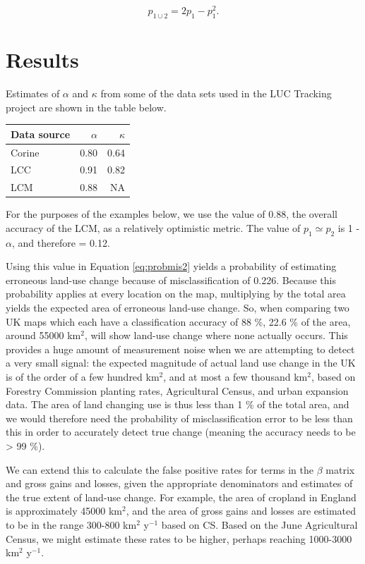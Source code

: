 \documentclass[
]{book}
\begin{document}
\begin{equation} \label{eq:probmis2}
  p_{1 \cup 2} = 2 p_1 - p_1^2.
\end{equation}

\hypertarget{results-3}{%
\section{Results}\label{results-3}}

Estimates of \(\alpha\) and \(\kappa\) from some of the data sets used in the LUC Tracking project are shown in the table below.

\begin{tabular}{l|r|r}
\hline
Data source & $\alpha$ & $\kappa$\\
\hline
Corine & 0.80 & 0.64\\
\hline
LCC & 0.91 & 0.82\\
\hline
LCM & 0.88 & NA\\
\hline
\end{tabular}

For the purposes of the examples below, we use the value of 0.88, the overall accuracy of the LCM, as a relatively optimistic metric.
The value of \(p_1 \simeq p_2\) is 1 - \(\alpha\), and therefore = 0.12.

Using this value in Equation \ref{eq:probmis2} yields a probability of estimating erroneous land-use change because of misclassification of 0.226.
Because this probability applies at every location on the map, multiplying by the total area yields the expected area of erroneous land-use change.
So, when comparing two UK maps which each have a classification accuracy of 88 \%, 22.6 \% of the area, around 55000 km\(^2\), will show land-use change where none actually occurs. This provides a huge amount of measurement noise when we are attempting to detect a very small signal: the expected magnitude of actual land use change in the UK is of the order of a few hundred km\(^2\), and at most a few thousand km\(^2\), based on Forestry Commission planting rates, Agricultural Census, and urban expansion data. The area of land changing use is thus less than 1 \% of the total area, and we would therefore need the probability of misclassification error to be less than this in order to accurately detect true change (meaning the accuracy needs to be \textgreater{} 99 \%).

We can extend this to calculate the false positive rates for terms in the \(\beta\) matrix and gross gains and losses, given the appropriate denominators and estimates of the true extent of land-use change. For example, the area of cropland in England is approximately 45000 km\(^2\), and the area of gross gains and losses are estimated to be in the range 300-800 km\(^2\) y\(^{-1}\) based on CS. Based on the June Agricultural Census, we might estimate these rates to be higher, perhaps reaching 1000-3000 km\(^2\) y\(^{-1}\).
\end{document}
